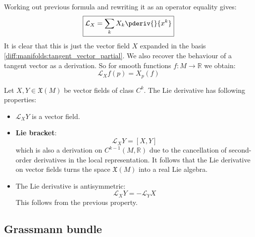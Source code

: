 	\begin{formula}[$\dag$]\label{manifolds:ex:lie_derivative_function}
		Working out previous formula and rewriting it as an operator equality gives:
		\begin{equation}
			\label{manifolds:lie_derivative_function_expansion}
			\boxed{\mathcal{L}_X = \sum_kX_k\pderiv{}{x^k}}
		\end{equation}
		It is clear that this is just the vector field $X$ expanded in the basis \ref{diff:manifolds:tangent_vector_partial}. We also recover the behaviour of a tangent vector as a derivation. So for smooth functions $f:M\rightarrow\mathbb{R}$ we obtain:
		\begin{equation}
			\mathcal{L}_Xf(p) = X_p(f)
		\end{equation}
	\end{formula}
	
	\begin{property}
		Let $X, Y\in\mathfrak{X}(M)$ be vector fields of class $C^k$. The Lie derivative has following properties:
		\begin{itemize}
			\item $\mathcal{L}_XY$ is a vector field.
			\item \textbf{Lie bracket}:
				\begin{equation}
					\label{manifolds:lie_bracket}
					\mathcal{L}_XY = [X, Y]
				\end{equation}
				which is also a derivation on $C^{k-1}(M, \mathbb{R})$ due to the cancellation of second-order derivatives in the local representation. It follows that the Lie derivative on vector fields turns the space $\mathfrak{X}(M)$ into a real Lie algebra.
			\item The Lie derivative is antisymmetric:
				\begin{equation}
					\mathcal{L}_XY = -\mathcal{L}_YX
				\end{equation}
				This follows from the previous property.
		\end{itemize}
	\end{property}

\subsection{Grassmann bundle}

